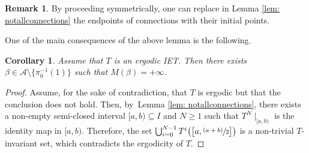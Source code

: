 \documentclass[10pt,a4paper]{amsart}
\newcommand{\psfrac}[2]{\sfrac{(#1)}{#2}}
\theoremstyle{plain}
\newtheorem{corollary}[theorem]{Corollary}
\theoremstyle{definition}
\newtheorem{remark}[theorem]{Remark}
\begin{document}
\begin{remark}
By proceeding symmetrically, one can replace in Lemma \ref{lem: notallconnections} the endpoints of connections with their initial points.
\end{remark}

One of the main consequences of the above lemma is the following.

\skpt
\begin{corollary}\label{cor: existenceofinfiniteorbit}
Assume that $T$ is an ergodic IET. Then there exists {$\beta \in\mathcal A \setminus \{\pi_0^{-1}(1)\}$ such that $M(\beta) = +\infty$. }
\end{corollary}

\begin{proof}
Assume, for the sake of contradiction, that $T$ is ergodic but that the conclusion does not hold. Then, by~Lemma \ref{lem: notallconnections}, there exists a non-empty semi-closed interval $[a, b) \subseteq I$ and $N \geq 1$ such that $T^N\mid_{[a, b)}$ is the identity map in $[a, b)$. Therefore, the set $\bigcup_{i = 0}^{N - 1} T^i\big( \big[a, \psfrac{a + b}{2}\big]\big)$ is a non-trivial $T$-invariant set, which contradicts the ergodicity of $T$.
\end{proof}
\end{document}

